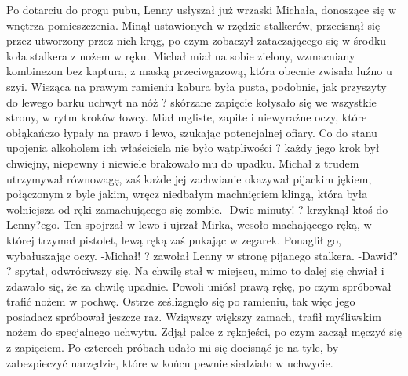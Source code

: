 \documentclass[../MAIN.tex]{subfiles}
\begin{document}
Po dotarciu do progu pubu, Lenny usłyszał już wrzaski Michała, donoszące się w wnętrza pomieszczenia. Minął ustawionych w rzędzie stalkerów, przecisnął się przez utworzony przez nich krąg, po czym zobaczył zataczającego się w środku koła stalkera z nożem w ręku.
Michał miał na sobie zielony, wzmacniany kombinezon bez kaptura, z maską przeciwgazową, która obecnie zwisała luźno u szyi. Wisząca na prawym ramieniu kabura była pusta, podobnie, jak przyszyty do lewego barku uchwyt na nóż ? skórzane zapięcie kołysało się we wszystkie strony, w rytm kroków łowcy.
Miał mgliste, zapite i niewyraźne oczy, które obłąkańczo łypały na prawo i lewo, szukając potencjalnej ofiary. Co do stanu upojenia alkoholem ich właściciela nie było wątpliwości ? każdy jego krok był chwiejny, niepewny i niewiele brakowało mu do upadku. Michał z trudem utrzymywał równowagę, zaś każde jej zachwianie okazywał pijackim jękiem, połączonym z byle jakim, wręcz niedbałym machnięciem klingą, która była wolniejsza od ręki zamachującego się zombie.
-Dwie minuty! ? krzyknął ktoś do Lenny?ego. Ten spojrzał w lewo i ujrzał Mirka, wesoło machającego ręką, w której trzymał pistolet, lewą ręką zaś pukając w zegarek. Ponaglił go, wybałuszając oczy.
-Michał! ? zawołał Lenny w stronę pijanego stalkera.
-Dawid? ? spytał, odwróciwszy się. Na chwilę stał w miejscu, mimo to dalej się chwiał i zdawało się, że za chwilę upadnie. Powoli uniósł prawą rękę, po czym spróbował trafić nożem w pochwę. Ostrze ześlizgnęło się po ramieniu, tak więc jego posiadacz spróbował jeszcze raz. Wziąwszy większy zamach, trafił myśliwskim nożem do specjalnego uchwytu. Zdjął palce z rękojeści, po czym zaczął męczyć się z zapięciem. Po czterech próbach udało mi się docisnąć je na tyle, by zabezpieczyć narzędzie, które w końcu pewnie siedziało w uchwycie.
\end{document}
